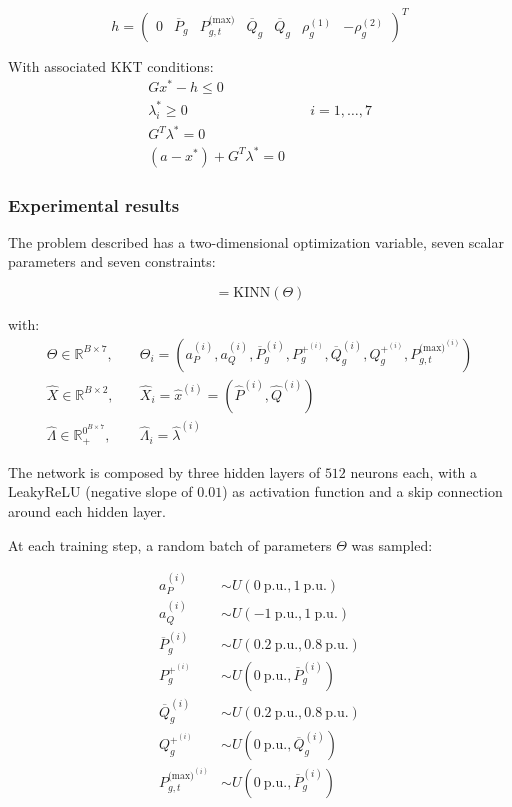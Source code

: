 \documentclass[
]{article}
\begin{document}
\begin{equation}
h = \begin{pmatrix}
0 & \overline{P}_g & P^{\textrm{(max)}}_{g,t} & \overline{Q}_g & \overline{Q}_g & \rho^{(1)}_g & -\rho^{(2)}_g
\end{pmatrix}^T
\end{equation}

With associated KKT conditions: \begin{align}
    G{x}^* - h \leq 0&\\
    \lambda_i^* \geq 0& \quad i=1,\dots, 7\\
    G^T\lambda^* = 0&\\
    (a-{x}^*) + G^T\lambda^*  = 0 &
\end{align}

\subsubsection{Experimental results}\label{experimental-results}

The problem described has a two-dimensional optimization variable, seven
scalar parameters and seven constraints:

\begin{equation}
 [\hat{X}, \hat\Lambda] = \mathrm{KINN}(\Theta)
\end{equation}

with: \begin{align}
\Theta \in \mathbb{R}^{B \times 7}, \quad&\Theta_{i} = (a_P^{(i)}, a_Q^{(i)},\overline{P}_g^{(i)},  P_g^{+^{(i)}}, \overline{Q}_g^{(i)},  Q_g^{+^{(i)}}, P^{\textrm{(max)}^{(i)}}_{g,t})\\
\hat{X} \in \mathbb{R}^{B \times 2}, \quad&\hat{X}_{i} = \hat{x}^{(i)} = (\hat{P}^{(i)}, \hat{Q}^{(i)})\\
\hat\Lambda \in \mathbb{R}_+^{0^{B \times 7}}, \quad&\hat\Lambda_{i} = \hat\lambda^{(i)}
\end{align}

The network is composed by three hidden layers of \(512\) neurons each,
with a LeakyReLU (negative slope of \(0.01\)) as activation function and
a skip connection around each hidden layer.

At each training step, a random batch of parameters \(\Theta\) was
sampled:

\begin{align}
a_P^{(i)} &\sim U(0~\mathrm{p.u}., 1~\mathrm{p.u.})\\
a_Q^{(i)} &\sim U(-1~\mathrm{p.u}., 1~\mathrm{p.u.})\\
\overline{P}_g^{(i)} &\sim U(0.2~\mathrm{p.u}., 0.8~\mathrm{p.u.})\\
P_g^{+^{(i)}} &\sim U(0~\mathrm{p.u}., \overline{P}_g^{(i)})\\
\overline{Q}_g^{(i)} &\sim U(0.2~\mathrm{p.u}., 0.8~\mathrm{p.u.})\\
Q_g^{+^{(i)}} &\sim U(0~\mathrm{p.u}., \overline{Q}_g^{(i)})\\
P^{\textrm{(max)}^{(i)}}_{g,t} &\sim U(0~\mathrm{p.u}., \overline{P}_g^{(i)})
\end{align}
\end{document}
